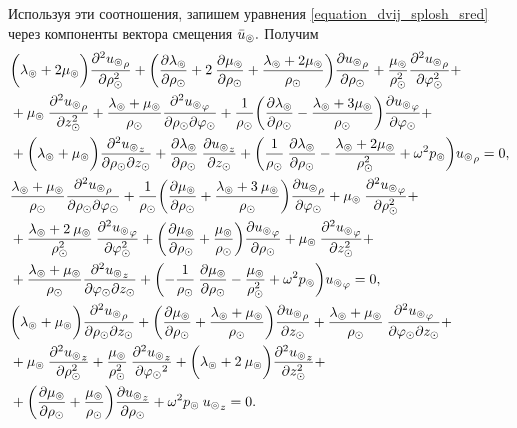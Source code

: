 Используя эти соотношения, запишем уравнения \eqref{equation_dvij_splosh_sred} через компоненты вектора смещения $\bar{u}_\circledcirc.$ Получим
\begin{equation}\label{equation_otn_u}
\begin{aligned}
&\biggl(\lambda_\circledcirc+2\mu_\circledcirc\biggr)\frac{\partial^2{u_\circledcirc}_{\rho}}{\partial \rho^2_\odot}+\biggl(\frac{\partial\lambda_\circledcirc}{\partial \rho_\odot}+2\:\frac{\partial\mu_\circledcirc}{\partial \rho_\odot}+\frac{\lambda_\circledcirc+2\mu_\circledcirc}{\rho_\odot}\biggr)\frac{\partial {u_\circledcirc}_{\rho}}{\partial \rho_\odot}+\frac{\mu_\circledcirc}{\rho^2_\odot}\frac{\partial^2 {u_\circledcirc}_{\rho}}{\partial \varphi^2_\odot}+\\
&+\mu_\circledcirc\:\frac{\partial^2 {u_\circledcirc}_{\rho}}{\partial z^2_\odot}+\frac{\lambda_\circledcirc+\mu_\circledcirc}{\rho_\odot}\frac{\partial^2 {u_\circledcirc}_{\varphi}}{\partial \rho_\odot\partial\varphi_\odot}+\frac{1}{\rho_\odot}\biggl(\frac{\partial\lambda_\circledcirc}{\partial \rho_\odot}-\frac{\lambda_\circledcirc+3\mu_\circledcirc}{\rho_\odot}\biggr)\frac{\partial {u_\circledcirc}_{\varphi}}{\partial\varphi_\odot}+\\
&+\biggl(\lambda_\circledcirc+\mu_\circledcirc\biggr)\frac{\partial^2 {u_\circledcirc}_{z}}{\partial \rho_\odot\partial z_\odot}+\frac{\partial\lambda_\circledcirc}{\partial \rho_\odot}\:\frac{\partial {u_\circledcirc}_{z}}{\partial z_\odot}+\biggl(\frac{1}{\rho_\odot}\:\frac{\partial\lambda_\circledcirc}{\partial \rho_\odot}-\frac{\lambda_\circledcirc+2\mu_\circledcirc}{\rho^2_\odot}+\omega^2 p_\circledcirc\biggr){u_\circledcirc}_{\rho}=0,\\
&\frac{\lambda_\circledcirc+\mu_\circledcirc}{\rho_\odot}\frac{\partial^2{u_\circledcirc}_{\rho}}{\partial \rho_\odot\partial\varphi_\odot}+\frac{1}{\rho_\odot}\biggl(\frac{\partial\mu_\circledcirc}{\partial \rho_\odot}+\frac{\lambda_\circledcirc+3\:\mu_\circledcirc}{\rho_\odot}\biggr)\frac{\partial {u_\circledcirc}_{\rho}}{\partial\varphi_\odot}+\mu_\circledcirc\:\frac{\partial^2 {u_\circledcirc}_{\varphi}}{\partial \rho^2_\odot}+\\
&+\frac{\lambda_\circledcirc+2\:\mu_\circledcirc}{\rho^2_\odot}\:\frac{\partial^2 {u_\circledcirc}_{\varphi}}{\partial \varphi^2_\odot}+\biggl(\frac{\partial\mu_\circledcirc}{\partial \rho_\odot}+\frac{\mu_\circledcirc}{\rho_\odot}\biggr)\frac{\partial {u_\circledcirc}_{\varphi}}{\partial \rho_\odot}+\mu_\circledcirc\:\frac{\partial^2 {u_\circledcirc}_{\varphi}}{\partial z^2_\odot}+\\
&+\frac{\lambda_\circledcirc+\mu_\circledcirc}{\rho_\odot}\frac{\partial^2 {u_\circledcirc}_{z}}{\partial \varphi_\odot\partial z_\odot}+\biggl(-\frac{1}{\rho_\odot}\:\frac{\partial\mu_\circledcirc}{\partial \rho_\odot}-\frac{\mu_\circledcirc}{\rho^2_\odot}+\omega^2 p_\circledcirc\biggr){u_\circledcirc}_{\varphi}=0,\\
&\biggl(\lambda_\circledcirc+\mu_\circledcirc\biggr)\frac{\partial^2{u_\circledcirc}_{\rho}}{\partial \rho_\odot\partial z_\odot}+\biggl(\frac{\partial\mu_\circledcirc}{\partial \rho_\odot}+\frac{\lambda_\circledcirc+\mu_\circledcirc}{\rho_\odot}\biggr)\frac{\partial {u_\circledcirc}_{\rho}}{\partial z_\odot}+\frac{\lambda_\circledcirc+\mu_\circledcirc}{\rho_\odot}\:\frac{\partial^2 {u_\circledcirc}_{\varphi}}{\partial \varphi_\odot\partial z_\odot}+\\
&+\mu_\circledcirc\:\frac{\partial^2 {u_\circledcirc}_{z}}{\partial \rho^2_\odot}+\frac{\mu_\circledcirc}{\rho^2_\odot}\:\frac{\partial^2 {u_\circledcirc}_{z}}{\partial {\varphi_\odot}^2}+\biggl(\lambda_\circledcirc+2\:\mu_\circledcirc\biggr)\frac{\partial^2 {u_\circledcirc}_{z}}{\partial z^2_\odot}+\\
&+\biggl(\frac{\partial\mu_\circledcirc}{\partial \rho_\odot}+\frac{\mu_\circledcirc}{\rho_\odot}\biggr)\frac{\partial {u_\circledcirc}_{z}}{\partial \rho_\odot}+\omega^2 p_\circledcirc\:{u_\circledcirc}_{z}=0.
\end{aligned}
\end{equation}

